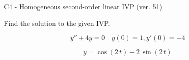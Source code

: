 \begin{exercise}
  \begin{exerciseTitle}C4 - Homogeneous second-order linear IVP (ver. 51)\end{exerciseTitle}
  \begin{exerciseStatement}
    
Find the solution to the given IVP.

    
\[y''+4y = 0 \hspace{1em} y(0) = 1 , y'(0) = -4\]

  \end{exerciseStatement}
  \begin{exerciseAnswer}
    
\[y= \cos\left(2 \, t\right) - 2 \, \sin\left(2 \, t\right)\]

  \end{exerciseAnswer}
\end{exercise}